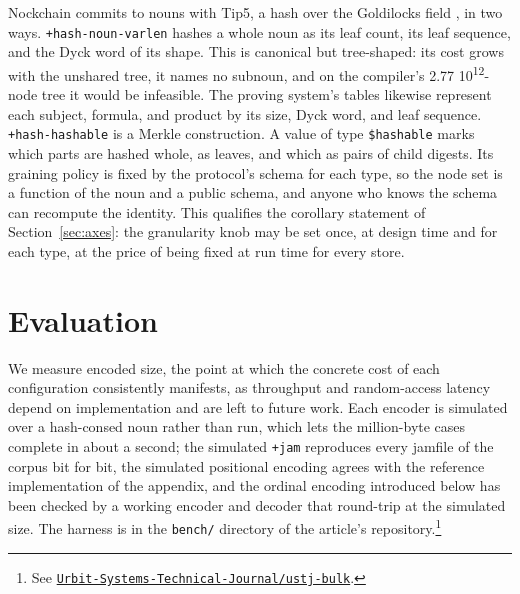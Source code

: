 \documentclass[twoside]{article}
\newcommand{\sci}[2]{#1\,\texttimes\,10\textsuperscript{#2}}
\begin{document}
Nockchain commits to nouns with Tip5, a hash over the Goldilocks field \citep{nockchain}, in two ways.  \lstinline[style=inlinecode]{+hash-noun-varlen} hashes a whole noun as its leaf count, its leaf sequence, and the Dyck word of its shape.  This is canonical but tree-shaped:  its cost grows with the unshared tree, it names no subnoun, and on the compiler's \sci{2.77}{12}-node tree it would be infeasible.  The proving system's tables likewise represent each subject, formula, and product by its size, Dyck word, and leaf sequence.  \lstinline[style=inlinecode]{+hash-hashable} is a Merkle construction.  A value of type \lstinline[style=inlinecode]{$hashable} marks which parts are hashed whole, as leaves, and which as pairs of child digests.  Its graining policy is fixed by the protocol's schema for each type, so the node set is a function of the noun and a public schema, and anyone who knows the schema can recompute the identity.  This qualifies the corollary statement of Section~\ref{sec:axes}:  the granularity knob may be set once, at design time and for each type, at the price of being fixed at run time for every store.

\section{Evaluation}
\label{sec:eval}

We measure encoded size, the point at which the concrete cost of each configuration consistently manifests, as throughput and random-access latency depend on implementation and are left to future work.
Each encoder is simulated over a hash-consed noun rather than run, which lets the million-byte cases complete in about a second; the simulated \texttt{+jam} reproduces every jamfile of the corpus bit for bit, the simulated positional encoding agrees with the reference implementation of the appendix, and the ordinal encoding introduced below has been checked by a working encoder and decoder that round-trip at the simulated size.  The harness is in the \texttt{bench/} directory of the article's repository.\footnote{See \href{https://github.com/Urbit-Systems-Technical-Journal/ustj-bulk}{\texttt{Urbit-Systems-Technical-Journal/ustj-bulk}}.}
\end{document}
